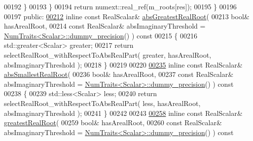 \begin{DoxyCode}
00192         \}
00193       \}
00194       \textcolor{keywordflow}{return} numext::real\_ref(m\_roots[res]);
00195     \}
00196 
00197   \textcolor{keyword}{public}:
\hyperlink{class_eigen_1_1_polynomial_solver_base_aa2f003d9662af8c776f1a1c12a9d4210}{00212}     \textcolor{keyword}{inline} \textcolor{keyword}{const} RealScalar& \hyperlink{class_eigen_1_1_polynomial_solver_base_aa2f003d9662af8c776f1a1c12a9d4210}{absGreatestRealRoot}(
00213         \textcolor{keywordtype}{bool}& hasArealRoot,
00214         \textcolor{keyword}{const} RealScalar& absImaginaryThreshold = 
      \hyperlink{group___core___module_struct_eigen_1_1_num_traits}{NumTraits<Scalar>::dummy\_precision}() )\textcolor{keyword}{ const}
00215 \textcolor{keyword}{    }\{
00216       std::greater<Scalar> greater;
00217       \textcolor{keywordflow}{return} selectRealRoot\_withRespectToAbsRealPart( greater, hasArealRoot, absImaginaryThreshold );
00218     \}
00219 
00220 
\hyperlink{class_eigen_1_1_polynomial_solver_base_a9316eeb24076bcd4f60ea4d7f3e549eb}{00235}     \textcolor{keyword}{inline} \textcolor{keyword}{const} RealScalar& \hyperlink{class_eigen_1_1_polynomial_solver_base_a9316eeb24076bcd4f60ea4d7f3e549eb}{absSmallestRealRoot}(
00236         \textcolor{keywordtype}{bool}& hasArealRoot,
00237         \textcolor{keyword}{const} RealScalar& absImaginaryThreshold = 
      \hyperlink{group___core___module_struct_eigen_1_1_num_traits}{NumTraits<Scalar>::dummy\_precision}() )\textcolor{keyword}{ const}
00238 \textcolor{keyword}{    }\{
00239       std::less<Scalar> less;
00240       \textcolor{keywordflow}{return} selectRealRoot\_withRespectToAbsRealPart( less, hasArealRoot, absImaginaryThreshold );
00241     \}
00242 
00243 
\hyperlink{class_eigen_1_1_polynomial_solver_base_a5094b7ccc49918b7c7ae9e2a8c49d4bd}{00258}     \textcolor{keyword}{inline} \textcolor{keyword}{const} RealScalar& \hyperlink{class_eigen_1_1_polynomial_solver_base_a5094b7ccc49918b7c7ae9e2a8c49d4bd}{greatestRealRoot}(
00259         \textcolor{keywordtype}{bool}& hasArealRoot,
00260         \textcolor{keyword}{const} RealScalar& absImaginaryThreshold = 
      \hyperlink{group___core___module_struct_eigen_1_1_num_traits}{NumTraits<Scalar>::dummy\_precision}() )\textcolor{keyword}{ const}

\end{DoxyCode}
